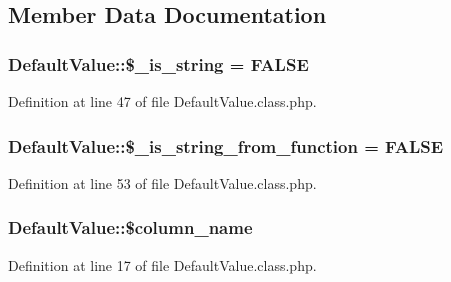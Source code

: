 \subsection{Member Data Documentation}
\subsubsection[{\texorpdfstring{\$\+\_\+is\+\_\+string}{$_is_string}}]{\setlength{\rightskip}{0pt plus 5cm}Default\+Value\+::\$\+\_\+is\+\_\+string = F\+A\+L\+SE}\hypertarget{classDefaultValue_ac3b23483d015be5b48517fb96890b64a}{}\label{classDefaultValue_ac3b23483d015be5b48517fb96890b64a}


Definition at line 47 of file Default\+Value.\+class.\+php.

\subsubsection[{\texorpdfstring{\$\+\_\+is\+\_\+string\+\_\+from\+\_\+function}{$_is_string_from_function}}]{\setlength{\rightskip}{0pt plus 5cm}Default\+Value\+::\$\+\_\+is\+\_\+string\+\_\+from\+\_\+function = F\+A\+L\+SE}\hypertarget{classDefaultValue_a000cf284b962d5c3354abd73b611c888}{}\label{classDefaultValue_a000cf284b962d5c3354abd73b611c888}


Definition at line 53 of file Default\+Value.\+class.\+php.

\subsubsection[{\texorpdfstring{\$column\+\_\+name}{$column_name}}]{\setlength{\rightskip}{0pt plus 5cm}Default\+Value\+::\$column\+\_\+name}\hypertarget{classDefaultValue_a671e32e797e9975b6497a56a5ba92dc6}{}\label{classDefaultValue_a671e32e797e9975b6497a56a5ba92dc6}


Definition at line 17 of file Default\+Value.\+class.\+php.

